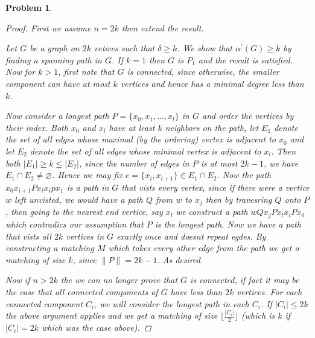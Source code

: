 \documentclass{article}
\newtheorem{prb}{Problem}
\begin{document}
\begin{prb} 

	\begin{proof} 
	First we assume $n = 2k$ then extend the result. 

	Let $G$ be a graph on $2k$ vetices such that $\delta \geq k$. We show that $\alpha^\prime(G) \geq k$ by finding a spanning path in $G$. 
	If $k = 1$ then $G$ is $P_1$ and the result is satisfied. Now for $k > 1$, first note that $G$ is connected, since otherwise, the smaller component can have at most $k$ vertices and hence has a minimal degree less than $k$.


	Now consider a longest path $P = \{ x_0, x_1, \dots, x_l\}$ in $G$ and order the vertices by their index. 
	Both $x_0$ and $x_l$ have at least $k$ neighbors on the path, let $E_1$ denote the set of all edges whose maximal (by the ordering) vertex is 
	adjacent to $x_0$ and let $E_2$ denote the set of all edges whose minimal vertex is adjacent to $x_l$. 
	Then both $|E_1| \geq k \leq |E_2|$, since the number of edges in $P$ is at most $2k - 1$, we have $E_1 \cap E_2 \neq \varnothing$. 
	Hence we may fix $e = \{x_i, x_{i+1} \} \in E_1 \cap E_2$. 
	Now the path $x_0x_{i+1}Px_lx_ipx_1$ is a path in $G$ that vists every vertex, since if there were a vertice $w$ left unvisted, 
	we would have a path $Q$ from $w$ to $x_j$ then by travesring $Q$ onto $P$, then going to the nearest end vertice, say $x_l$ we construct a path 
	$wQx_jPx_lx_iPx_0$ which contradics our assumption that $P$ is the longest path. 
	Now we have a path that vists all $2k$ vertices in $G$ exactly once and doesnt repeat egdes. By constructing a matching $M$ which takes 
	every other edge from the path we get a matching of size $k$, since $\|P\| = 2k-1$. As desired. 


	Now if $n > 2k$ the we can no longer prove that $G$ is connected, if fact it may be the case that all connected components of $G$ have less than $2k$ vertices. For each connected component $C_i$, 
	we will consider the longest path in each $C_i$. If $|C_i| \leq 2k$ the above argument applies and we get a matching of size $\lfloor \frac{|C_i|}{2} \rfloor$ (which is $k$ if $|C_i| = 2k$ which was the case above). 


\end{proof}
\end{prb}
\end{document}
